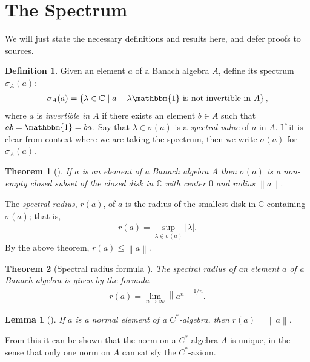\documentclass[11pt,a4paper]{report}
\theoremstyle{plain}
\newtheorem*{thm*}{Theorem}
\newtheorem{lemma}{Lemma}
\theoremstyle{definition}
\newtheorem{defn}{Definition}
\newcommand{\1}{\mathbbm{1}}
\newcommand{\C}{\mathbb{C}}
\newcommand{\spec}[1]{\sigma(#1)}
\begin{document}
\section{The Spectrum}
We will just state the necessary definitions and results here, and defer proofs to sources.

\begin{defn}
	Given an element $a$ of a Banach algebra $A$, define its spectrum $\sigma_A(a)$:
	\begin{align*}
		\sigma_A(a)=\left\{\lambda\in \C \mid a-\lambda\1 \mbox{ is not invertible in }A\right\},
	\end{align*}
	where $a$ is \emph{invertible in $A$} if there exists an element $b\in A$ such that $ab=\1=ba$. 
	Say that $\lambda\in\spec a$ is a \emph{spectral value} of $a$ in $A$. If it is clear from context 
	where we are taking the spectrum, then we write $\spec{a}$ for $\sigma_A(a)$. 
\end{defn}

\begin{thm*}[{\cite[3.2.3]{kadison83}}]
	If $a$ is an element of a Banach algebra $A$ then $\spec a$ is a non-empty closed subset of the
	closed disk in $\C$ with center $0$ and radius $\left\|a\right\|$.
\end{thm*}

The \emph{spectral radius}, $r(a)$, of $a$ is the radius of the smallest disk in $\C$ containing 
$\spec a$; that is, 
\begin{align*}
	r(a)=\sup_{\lambda\in\spec a}{|\lambda|}.
\end{align*}
By the above theorem, $r(a)\leq\left\|a\right\|$. 

\begin{thm*}[Spectral radius formula {\cite[3.3.3]{kadison83}}]
	The spectral radius of an element $a$ of a Banach algebra is given by the formula
	\begin{align*}
		r(a)= \lim_{n\to\infty} \left\|a^n\right\|^{1/n}.
	\end{align*}
\end{thm*}

\begin{lemma}[{\cite[4.1.1(i)]{kadison83}}]\label{lemma:411}
	If $a$ is a normal element of a $C^\ast$-algebra, then $r(a)=\left\|a\right\|$.
\end{lemma}

From this it can be shown that the norm on a $C^\ast$ algebra $A$ is unique, in the sense that only one norm on $A$ can satisfy the $C^\ast$-axiom. \cite[II.1.6.5]{blackadar06}
\end{document}
